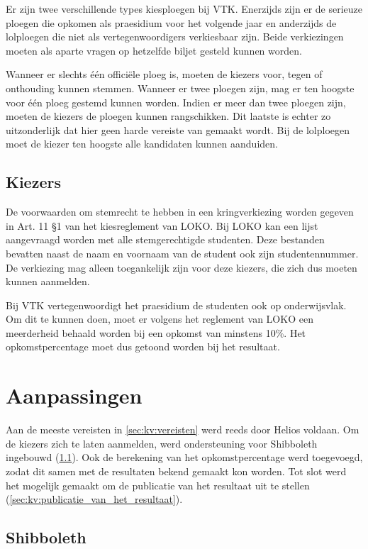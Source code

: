 Er zijn twee verschillende types kiesploegen bij VTK. Enerzijds zijn er de serieuze ploegen die opkomen als praesidium voor het volgende jaar en anderzijds de lolploegen die niet als vertegenwoordigers verkiesbaar zijn. Beide verkiezingen moeten als aparte vragen op hetzelfde biljet gesteld kunnen worden.

\npar Wanneer er slechts \'e\'en offici\"ele ploeg is, moeten de kiezers voor, tegen of onthouding kunnen stemmen. Wanneer er twee ploegen zijn, mag er ten hoogste voor \'e\'en ploeg gestemd kunnen worden. Indien er meer dan twee ploegen zijn, moeten de kiezers de ploegen kunnen rangschikken. Dit laatste is echter zo uitzonderlijk dat hier geen harde vereiste van gemaakt wordt. Bij de lolploegen moet de kiezer ten hoogste alle kandidaten kunnen aanduiden.

\subsection{Kiezers}

De voorwaarden om stemrecht te hebben in een kringverkiezing worden gegeven in Art. 11 \S 1 van het kiesreglement van LOKO.\cite{loko_kiesreglement_verkiezingen} Bij LOKO kan een lijst aangevraagd worden met alle stemgerechtigde studenten. Deze bestanden bevatten naast de naam en voornaam van de student ook zijn studentennummer. De verkiezing mag alleen toegankelijk zijn voor deze kiezers, die zich dus moeten kunnen aanmelden.

\npar Bij VTK vertegenwoordigt het praesidium de studenten ook op onderwijsvlak. Om dit te kunnen doen, moet er volgens het reglement van LOKO een meerderheid behaald worden bij een opkomst van minstens 10\%. Het opkomstpercentage moet dus getoond worden bij het resultaat.

\section{Aanpassingen}
\label{sec:kv:aanpassingen}

Aan de meeste vereisten in \ref{sec:kv:vereisten} werd reeds door Helios voldaan. Om de kiezers zich te laten aanmelden, werd ondersteuning voor Shibboleth ingebouwd (\ref{sec:kv:shibboleth}). Ook de berekening van het opkomstpercentage werd toegevoegd, zodat dit samen met de resultaten bekend gemaakt kon worden. Tot slot werd het mogelijk gemaakt om de publicatie van het resultaat uit te stellen (\ref{sec:kv:publicatie_van_het_resultaat}).

\subsection{Shibboleth}
\label{sec:kv:shibboleth}


